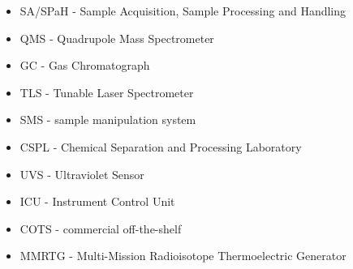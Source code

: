 \begin{itemize}
\item SA/SPaH - Sample Acquisition, Sample Processing and Handling
\item QMS - Quadrupole Mass Spectrometer
\item GC - Gas Chromatograph
\item TLS - Tunable Laser Spectrometer
\item SMS - sample manipulation system
\item CSPL - Chemical Separation and Processing Laboratory
\item UVS - Ultraviolet Sensor
\item ICU - Instrument Control Unit
\item COTS - commercial off-the-shelf
\item MMRTG - Multi-Mission Radioisotope Thermoelectric Generator
\end{itemize}